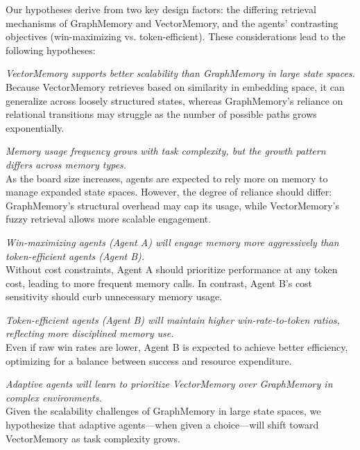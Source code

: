 \documentclass[10pt]{article}
\begin{document}
Our hypotheses derive from two key design factors: the differing retrieval mechanisms of GraphMemory and VectorMemory, and the agents' contrasting objectives (win-maximizing vs. token-efficient). These considerations lead to the following hypotheses:

\begin{description}[itemsep=0.5em, parsep=0.5em]
\item[\textbf{H1.1}] \textit{VectorMemory supports better scalability than GraphMemory in large state spaces.} \\
Because VectorMemory retrieves based on similarity in embedding space, it can generalize across loosely structured states, whereas GraphMemory's reliance on relational transitions may struggle as the number of possible paths grows exponentially.

\item[\textbf{H1.2}] \textit{Memory usage frequency grows with task complexity, but the growth pattern differs across memory types.} \\
As the board size increases, agents are expected to rely more on memory to manage expanded state spaces. However, the degree of reliance should differ: GraphMemory's structural overhead may cap its usage, while VectorMemory's fuzzy retrieval allows more scalable engagement.

\item[\textbf{H2.1}] \textit{Win-maximizing agents (Agent A) will engage memory more aggressively than token-efficient agents (Agent B).} \\
Without cost constraints, Agent A should prioritize performance at any token cost, leading to more frequent memory calls. In contrast, Agent B's cost sensitivity should curb unnecessary memory usage.

\item[\textbf{H2.2}] \textit{Token-efficient agents (Agent B) will maintain higher win-rate-to-token ratios, reflecting more disciplined memory use.} \\
Even if raw win rates are lower, Agent B is expected to achieve better efficiency, optimizing for a balance between success and resource expenditure.

\item[\textbf{H3}] \textit{Adaptive agents will learn to prioritize VectorMemory over GraphMemory in complex environments.} \\
Given the scalability challenges of GraphMemory in large state spaces, we hypothesize that adaptive agents—when given a choice—will shift toward VectorMemory as task complexity grows.
\end{description}
\end{document}
